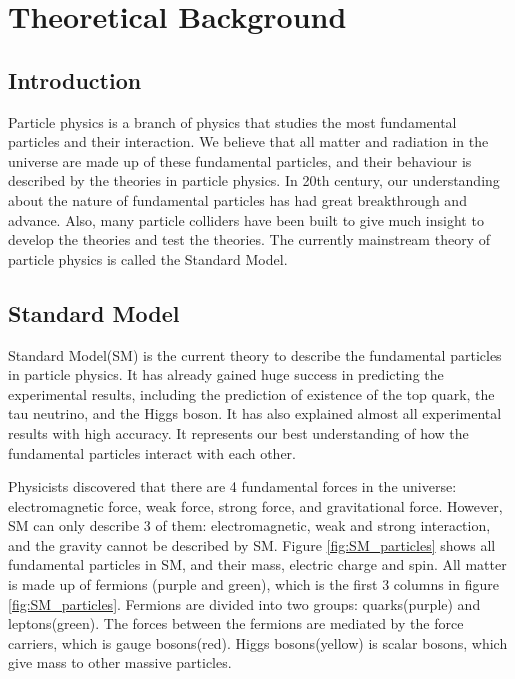 \chapter{Theoretical Background}
\label{ch:theory}

\section{Introduction}
Particle physics is a branch of physics that studies the most fundamental particles and their interaction.
We believe that all matter and radiation in the universe are made up of these fundamental particles, and their behaviour is described by the theories in particle physics.
In 20th century, our understanding about the nature of fundamental particles has had great breakthrough and  advance.
Also, many particle colliders have been built to give much insight to develop the theories and test the theories.
The currently mainstream theory of particle physics is called the Standard Model.

\section{Standard Model}
\label{sec:Standard_Model}
Standard Model(SM) is the current theory to describe the fundamental particles in particle physics.
It has already gained huge success in predicting the experimental results, including the prediction of existence of the top quark, the tau neutrino, and the Higgs boson.
It has also explained almost all experimental results with high accuracy.
It represents our best understanding of how the fundamental particles interact with each other.

Physicists discovered that there are 4 fundamental forces in the universe: electromagnetic force, weak force, strong force, and gravitational force.
However, SM can only describe 3 of them: electromagnetic, weak and strong interaction, and the gravity cannot be described by SM.
Figure \ref{fig:SM_particles} shows all fundamental particles in SM, and their mass, electric charge and spin.
All matter is made up of fermions (purple and green), which is the first 3 columns in figure \ref{fig:SM_particles}.
Fermions are divided into two groups: quarks(purple) and leptons(green).
The forces between the fermions are mediated by the force carriers, which is gauge bosons(red).
Higgs bosons(yellow) is scalar bosons, which give mass to other massive particles.

